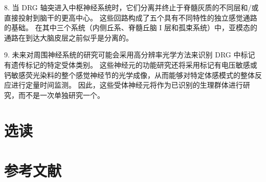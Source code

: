 8. 当 DRG 轴突进入中枢神经系统时，它们分离并终止于脊髓灰质的不同层和/或直接投射到脑干的更高中心。 这些回路构成了五个具有不同特性的独立感觉通路的基础。 在其中三个系统（内侧丘系、脊髓丘脑 I 层和孤束系统）中，亚模态的通路在到达大脑皮层之前似乎是分离的。 

9. 未来对周围神经系统的研究可能会采用高分辨率光学方法来识别 DRG 中标记有遗传标记的特定受体类别。 这些神经元的功能研究还将采用标记有电压敏感或钙敏感荧光染料的整个感觉神经节的光学成像，从而能够对特定体感模式的整体反应进行定量时间监测。 因此，这些受体神经元将作为已识别的生理群体进行研究，而不是一次单独研究一个。

\section{选读}

\section{参考文献}
